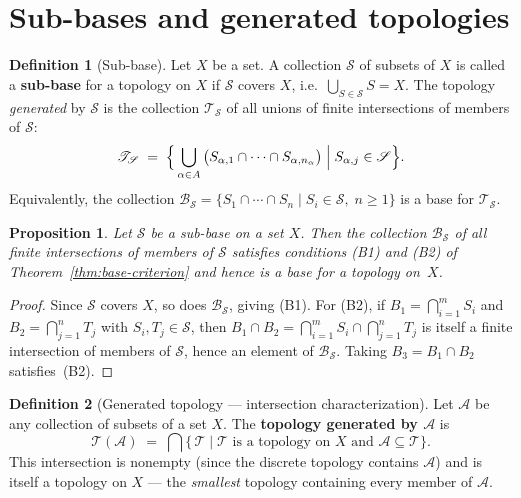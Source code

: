 \documentclass[11pt,a4paper,twoside]{book}
\newtheorem{proposition}[theorem]{Proposition}
\theoremstyle{remark}
\theoremstyle{definition}
\theoremstyle{definition}
\newtheorem{definition}{Definition}[section]
\begin{document}
\section{Sub-bases and generated topologies}
\label{sec:subbases}

\begin{definition}[Sub-base]
\label{def:subbase}
Let $X$ be a set.  A collection $\mathscr{S}$ of subsets of $X$ is called a
\textbf{sub-base} for a topology on $X$ if $\mathscr{S}$ covers $X$, i.e.\
$\bigcup_{S\in\mathscr{S}} S = X$.  The topology \emph{generated} by
$\mathscr{S}$ is the collection $\mathscr{T}_{\mathscr{S}}$ of all unions of
finite intersections of members of $\mathscr{S}$:
\[
    \mathscr{T}_{\mathscr{S}}
    \;=\;
    \Bigl\{\,
        \bigcup_{\alpha\in A}\,
        \bigl(S_{\alpha,1}\cap\cdots\cap S_{\alpha,n_\alpha}\bigr)
        \;\Big|\;
        S_{\alpha,j}\in\mathscr{S}
    \Bigr\}.
\]
Equivalently, the collection
$\mathscr{B}_{\mathscr{S}}=\{S_1\cap\cdots\cap S_n \mid
S_i\in\mathscr{S},\;n\ge 1\}$ is a base for $\mathscr{T}_{\mathscr{S}}$.
\end{definition}

\begin{proposition}
\label{prop:subbase-is-base}
Let $\mathscr{S}$ be a sub-base on a set $X$.  Then the collection
$\mathscr{B}_{\mathscr{S}}$ of all finite intersections of members of
$\mathscr{S}$ satisfies conditions \textnormal{(B1)} and \textnormal{(B2)} of
Theorem~\ref{thm:base-criterion} and hence is a base for a topology on~$X$.
\end{proposition}

\begin{proof}
Since $\mathscr{S}$ covers $X$, so does $\mathscr{B}_{\mathscr{S}}$, giving
(B1).  For (B2), if $B_1=\bigcap_{i=1}^{m}S_i$ and
$B_2=\bigcap_{j=1}^{n}T_j$ with $S_i,T_j\in\mathscr{S}$, then
$B_1\cap B_2=\bigcap_{i=1}^{m}S_i\cap\bigcap_{j=1}^{n}T_j$ is itself a
finite intersection of members of $\mathscr{S}$, hence an element of
$\mathscr{B}_{\mathscr{S}}$.  Taking $B_3=B_1\cap B_2$ satisfies~(B2).
\end{proof}

\begin{definition}[Generated topology --- intersection characterization]
\label{def:generated-topology}
Let $\mathscr{A}$ be any collection of subsets of a set $X$.  The
\textbf{topology generated by $\mathscr{A}$} is
\[
    \mathscr{T}(\mathscr{A})
    \;=\;
    \bigcap\bigl\{\,\mathscr{T} \;\big|\;
        \mathscr{T}\text{ is a topology on }X\text{ and }
        \mathscr{A}\subseteq\mathscr{T}
    \bigr\}.
\]
This intersection is nonempty (since the discrete topology contains
$\mathscr{A}$) and is itself a topology on $X$ --- the \emph{smallest}
topology containing every member of $\mathscr{A}$.
\end{definition}
\end{document}
